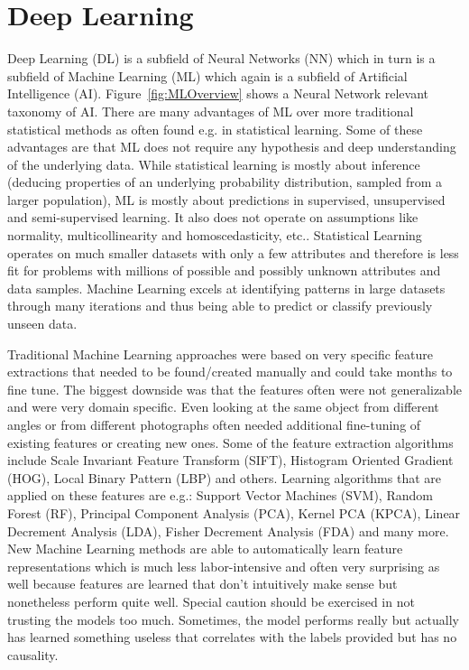 \chapter{Deep Learning}

Deep Learning (DL) is a subfield of Neural Networks (NN) which in turn is a subfield of Machine Learning (ML) which again is a subfield of Artificial Intelligence (AI). Figure~\ref{fig:MLOverview} shows a Neural Network relevant taxonomy of AI. There are many advantages of ML over more traditional statistical methods as often found e.g. in statistical learning. Some of these advantages are that ML does not require any hypothesis and deep understanding of the underlying data. While statistical learning is mostly about inference (deducing properties of an underlying probability distribution, sampled from a larger population), ML is mostly about predictions in supervised, unsupervised and semi-supervised learning. It also does not operate on assumptions like normality, multicollinearity and homoscedasticity, etc.. Statistical Learning operates on much smaller datasets with only a few attributes and therefore is less fit for problems with millions of possible and possibly unknown attributes and data samples. Machine Learning excels at identifying patterns in large datasets through many iterations and thus being able to predict or classify previously unseen data.

Traditional Machine Learning approaches were based on very specific feature extractions that needed to be found/created manually and could take months to fine tune. The biggest downside was that the features often were not generalizable and were very domain specific. Even looking at the same object from different angles or from different photographs often needed additional fine-tuning of existing features or creating new ones. Some of the feature extraction algorithms include Scale Invariant Feature Transform (SIFT), Histogram Oriented Gradient (HOG), Local Binary Pattern (LBP) and others. Learning algorithms that are applied on these features are e.g.: Support Vector Machines (SVM), Random Forest (RF), Principal Component Analysis (PCA), Kernel PCA (KPCA), Linear Decrement Analysis (LDA), Fisher Decrement Analysis (FDA) and many more. New Machine Learning methods are able to automatically learn feature representations which is much less labor-intensive and often very surprising as well because features are learned that don't intuitively make sense but nonetheless perform quite well. Special caution should be exercised in not trusting the models too much. Sometimes, the model performs really but actually has learned something useless that correlates with the labels provided but has no causality.\\


